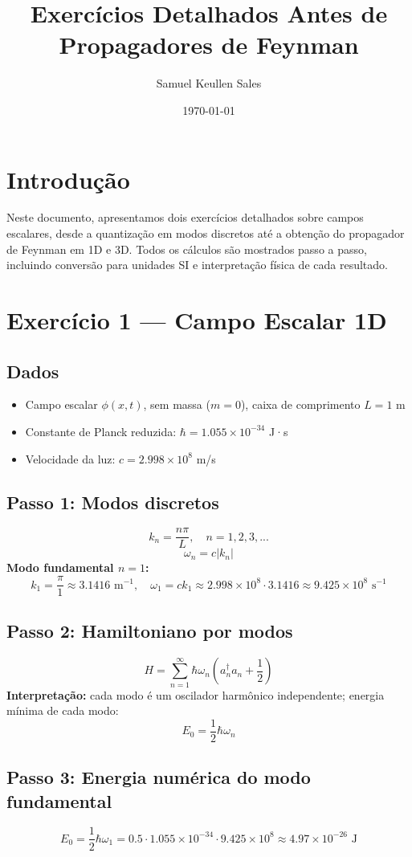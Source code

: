 \documentclass[12pt,a4paper]{article}
\title{Exercícios Detalhados Antes de Propagadores de Feynman}
\author{Samuel Keullen Sales}
\date{\today}
\begin{document}
\maketitle

\section{Introdução}
Neste documento, apresentamos dois exercícios detalhados sobre campos escalares, desde a quantização em modos discretos até a obtenção do propagador de Feynman em 1D e 3D. Todos os cálculos são mostrados passo a passo, incluindo conversão para unidades SI e interpretação física de cada resultado.  

\section{Exercício 1 — Campo Escalar 1D}
\subsection{Dados}
\begin{itemize}
    \item Campo escalar \(\phi(x,t)\), sem massa (\(m=0\)), caixa de comprimento \(L=1\) m
    \item Constante de Planck reduzida: \(\hbar = 1.055\times 10^{-34}\) J·s
    \item Velocidade da luz: \(c = 2.998\times 10^8\) m/s
\end{itemize}

\subsection{Passo 1: Modos discretos}
\[
k_n = \frac{n \pi}{L}, \quad n=1,2,3,...
\]
\[
\omega_n = c |k_n|
\]
\textbf{Modo fundamental \(n=1\):}
\[
k_1 = \frac{\pi}{1} \approx 3.1416 \text{ m}^{-1}, \quad
\omega_1 = c k_1 \approx 2.998\times10^8 \cdot 3.1416 \approx 9.425\times10^8 \text{ s}^{-1}
\]

\subsection{Passo 2: Hamiltoniano por modos}
\[
H = \sum_{n=1}^{\infty} \hbar \omega_n \left(a_n^\dagger a_n + \frac12\right)
\]
\textbf{Interpretação:} cada modo é um oscilador harmônico independente; energia mínima de cada modo: 
\[
E_0 = \frac12 \hbar \omega_n
\]

\subsection{Passo 3: Energia numérica do modo fundamental}
\[
E_0 = \frac12 \hbar \omega_1 = 0.5 \cdot 1.055\times10^{-34} \cdot 9.425\times10^8 \approx 4.97\times10^{-26} \text{ J}
\]
\end{document}

